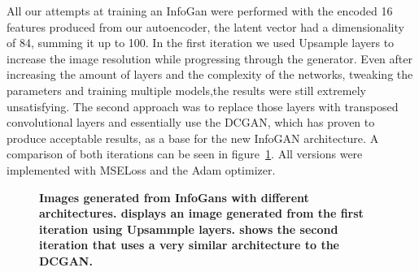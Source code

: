         All our attempts at training an InfoGan were performed with the encoded 16 features produced from our autoencoder, the latent vector had a dimensionality of 84, summing it up to 100. In the first iteration we used Upsample layers to increase the image resolution while progressing through the generator. Even after increasing the amount of layers and the complexity of the networks, tweaking the parameters and training multiple models,the results were still extremely unsatisfying. The second approach was to replace those layers with transposed convolutional layers and essentially use the DCGAN, which has proven to produce acceptable results, as a base for the new InfoGAN architecture. A comparison of both iterations can be seen in figure~\ref{fig:infogan_res_1}. All versions were implemented with MSELoss and the Adam optimizer.

        \begin{figure}[ht]
            \centering
            \caption[Images generated from InfoGans with different architectures.]
            {
                \textbf{Images generated from InfoGans with different architectures.  displays an image generated from the first iteration using Upsammple layers.  shows the second iteration that uses a very similar architecture to the DCGAN.}
            }
            \label{fig:infogan_res_1}
        \end{figure}

